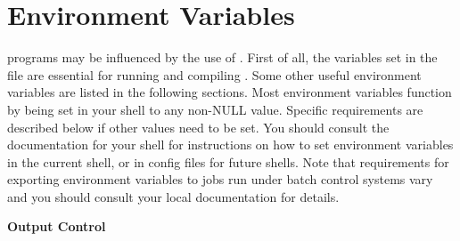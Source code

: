 \section{Environment Variables}
{\gromacs} programs may be influenced by the use of
.  First of all, the variables set in
the {\tt {}} file are essential for running and
compiling {\gromacs}. Some other useful environment variables are
listed in the following sections. Most environment variables function
by being set in your shell to any non-NULL value. Specific
requirements are described below if other values need to be set. You
should consult the documentation for your shell for instructions on
how to set environment variables in the current shell, or in config
files for future shells. Note that requirements for exporting
environment variables to jobs run under batch control systems vary and
you should consult your local documentation for details.

{\bf Output Control}

